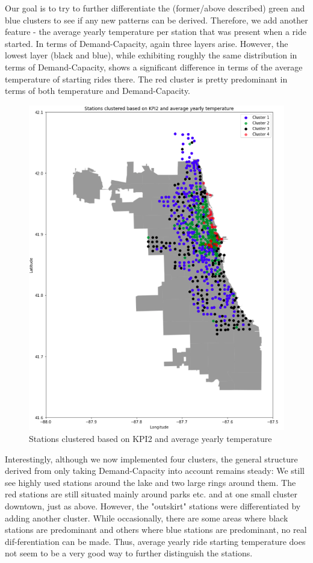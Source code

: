 Our goal is to try to further differentiate the (former/above described) green and blue clusters to see if any new patterns can be derived. Therefore, we add another feature - the average yearly temperature per station that was present when a ride started. In terms of Demand-Capacity, again three layers arise. However, the lowest layer (black and blue), while exhibiting roughly the same distribution in terms of Demand-Capacity, shows a significant difference in terms of the average temperature of starting rides there. The red cluster is pretty predominant in terms of both temperature and Demand-Capacity.

\begin{figure}[H]
   \centering
    \includegraphics[width=0.8\linewidth]{./Figures/BC_APP9.png}
    \caption{Stations clustered based on KPI2 and average yearly temperature}
    \label{BCAPP9}
\end{figure}

Interestingly, although we now implemented four clusters, the general structure derived from only taking Demand-Capacity into account remains steady: We still see highly used stations around the lake and two large rings around them. The red stations are still situated mainly around parks etc. and at one small cluster downtown, just as above. However, the "outskirt" stations were differentiated by adding another cluster. While occasionally, there are some areas where black stations are predominant and others where blue stations are predominant, no real dif-ferentiation can be made. Thus, average yearly ride starting temperature does not seem to be a very good way to further distinguish the stations.

